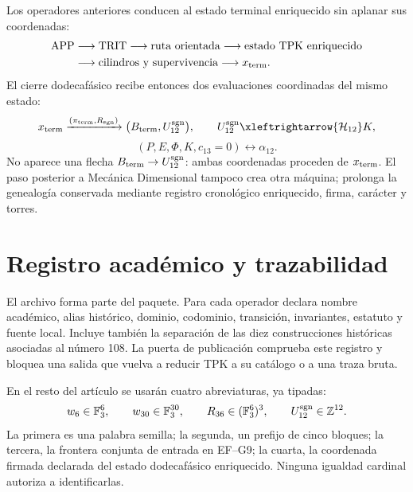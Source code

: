 Los operadores anteriores conducen al estado terminal enriquecido sin
aplanar sus coordenadas:
\[
 \begin{aligned}
 \mathrm{APP}&\longrightarrow\mathrm{TRIT}
 \longrightarrow\text{ruta orientada}
 \longrightarrow\text{estado TPK enriquecido}\\
 &\longrightarrow\text{cilindros y supervivencia}
 \longrightarrow x_{\rm term}.
 \end{aligned}
\]
El cierre dodecafásico recibe entonces dos evaluaciones coordinadas del mismo
estado:
\[
 x_{\rm term}
 \xrightarrow{(\pi_{\rm term},R_{\rm sgn})}
 \bigl(B_{\rm term},U_{12}^{\rm sgn}\bigr),
 \qquad
 U_{12}^{\rm sgn}\xleftrightarrow{\mathcal H_{12}}K,
\]
\[
 (P,E,\Phi,K,c_{13}=0)\longleftrightarrow\alpha_{12}.
\]
No aparece una flecha \(B_{\rm term}\to U_{12}^{\rm sgn}\): ambas
coordenadas proceden de \(x_{\rm term}\). El paso posterior a Mecánica
Dimensional tampoco crea otra máquina; prolonga la genealogía conservada
mediante registro cronológico enriquecido, firma, carácter y torres.

\ifdefined\HMTInternalTraceability
\section{Registro académico y trazabilidad}

El archivo  forma parte del paquete.
Para cada operador declara nombre acad\'emico, alias hist\'orico, dominio,
codominio, transici\'on, invariantes, estatuto y fuente local. Incluye tambi\'en
la separaci\'on de las diez construcciones hist\'oricas asociadas al n\'umero
108. La puerta de publicaci\'on comprueba este registro y bloquea una salida
que vuelva a reducir TPK a su cat\'alogo o a una traza bruta.

En el resto del art\'iculo se usar\'an cuatro abreviaturas, ya tipadas:
\[
 w_6\in\mathbb F_3^6,\qquad
 w_{30}\in\mathbb F_3^{30},\qquad
 R_{36}\in(\mathbb F_3^6)^3,\qquad
 U_{12}^{\rm sgn}\in\mathbb Z^{12}.
\]
La primera es una palabra semilla; la segunda, un prefijo de cinco bloques;
 la tercera, la frontera conjunta de entrada en EF--G9; la cuarta, la
coordenada firmada declarada del estado dodecaf\'asico enriquecido. Ninguna igualdad cardinal autoriza a
identificarlas.
\fi
